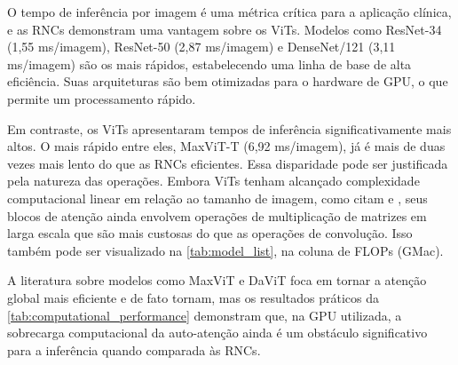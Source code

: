 O tempo de inferência por imagem é uma métrica crítica para a aplicação clínica, e as RNCs demonstram uma vantagem sobre os ViTs. Modelos como ResNet-34 (1,55 ms/imagem), ResNet-50 (2,87 ms/imagem) e DenseNet/121 (3,11 ms/imagem) são os mais rápidos, estabelecendo uma linha de base de alta eficiência. Suas arquiteturas são bem otimizadas para o hardware de GPU, o que permite um processamento rápido.

Em contraste, os ViTs apresentaram tempos de inferência significativamente mais altos. O mais rápido entre eles, MaxViT-T (6,92 ms/imagem), já é mais de duas vezes mais lento do que as RNCs eficientes. Essa disparidade pode ser justificada pela natureza das operações. Embora ViTs tenham alcançado complexidade computacional linear em relação ao tamanho de imagem, como citam \cite{ding2022davitdualattentionvision} e \cite{maxvit2022}, seus blocos de atenção ainda envolvem operações de multiplicação de matrizes em larga escala que são mais custosas do que as operações de convolução. Isso também pode ser visualizado na \autoref{tab:model_list}, na coluna de FLOPs (GMac).

A literatura sobre modelos como MaxViT e DaViT foca em tornar a atenção global mais eficiente e de fato tornam, mas os resultados práticos da \autoref{tab:computational_performance} demonstram que, na GPU utilizada, a sobrecarga computacional da auto-atenção ainda é um obstáculo significativo para a inferência quando comparada às RNCs.


